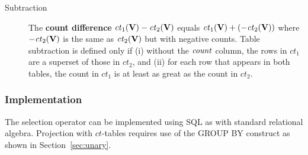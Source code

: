 \documentclass{sig-alternate-2013}
\newcommand{\ct}{\mathit{ct}}
\begin{document}
\begin{description}
\item[Subtraction] %
The \textbf{count difference} $\ct_{1}(\set{V}) - \ct_{2}(\set{V})$ equals $\ct_{1}(\set{V}) + (- \ct_{2}(\set{V}))$ where $- \ct_{2}(\set{V})$ is the same as $\ct_{2}(\set{V})$ but with negative counts. 
Table subtraction is defined only if (i) without the $\it{count}$ column, the rows in $\ct_{1}$ are a superset of those in $\ct_{2}$, and (ii) for each row that appears in both tables, the count in $\ct_{1}$ is at least as great as the count in $\ct_{2}$.
\end{description}


\subsubsection{Implementation}\label{sec:imp}

The selection operator can be implemented  using SQL as with standard relational algebra. 
Projection with $\ct$-tables requires use of the GROUP BY construct as shown in Section~\ref{sec:unary}. 
\end{document}
